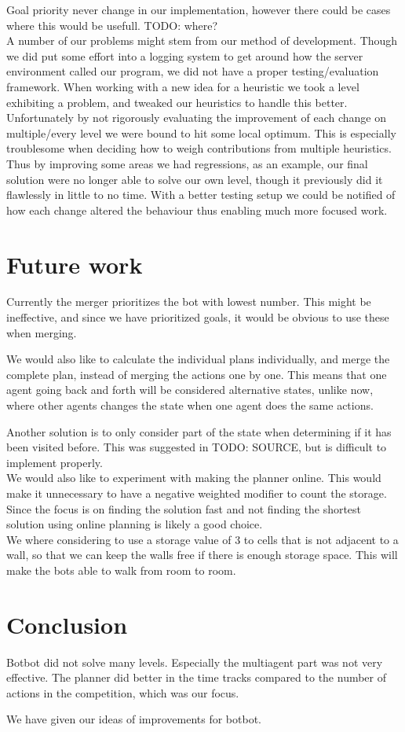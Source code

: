 \documentclass[letterpaper]{article}
\begin{document}
Goal priority never change in our implementation, however there could be cases
where this would be usefull. TODO: where?\\

A number of our problems might stem from our method of development.
Though we did put some effort into a logging system to get around how the server
environment called our program, we did not have a proper testing/evaluation
framework.
When working with a new idea for a heuristic we took a level exhibiting a
problem, and tweaked our heuristics to handle this better.
Unfortunately by not rigorously evaluating the improvement of each change on
multiple/every level we were bound to hit some local optimum. This is especially
troublesome when deciding how to weigh contributions from multiple heuristics.
Thus by improving some areas we had regressions, as an example, our final
solution were no longer able to solve our own level, though it previously did it
flawlessly in little to no time. With a better testing setup we could be notified of how
each change altered the behaviour thus enabling much more focused work.

\section{Future work}
Currently the merger prioritizes the bot with lowest number. This might be ineffective,
and since we have prioritized goals, it would be obvious to use these when merging.

We would also like to calculate the individual plans individually, and merge
the complete plan, instead of merging the actions one by one. This means that
one agent going back and forth will be considered alternative states, unlike now,
where other agents changes the state when one agent does the same actions.

Another solution is to only consider part of the state when determining if it has
been visited before. This was suggested in TODO: SOURCE, but is difficult to implement
properly.\\

We would also like to experiment with making the planner online. This would make
it unnecessary to have a negative weighted modifier to count the storage. Since
the focus is on finding the solution fast and not finding the shortest solution
using online planning is likely a good choice.\\

We where considering to use a storage value of 3 to cells that is not adjacent to
a wall, so that we can keep the walls free if there is enough storage space.
This will make the bots able to walk from room to room.\\
\section{Conclusion}
Botbot did not solve many levels. Especially the multiagent part was not
very effective. The planner did better in the time tracks compared
to the number of actions in the competition, which was our focus.

We have given our ideas of improvements for botbot.



\end{document}
